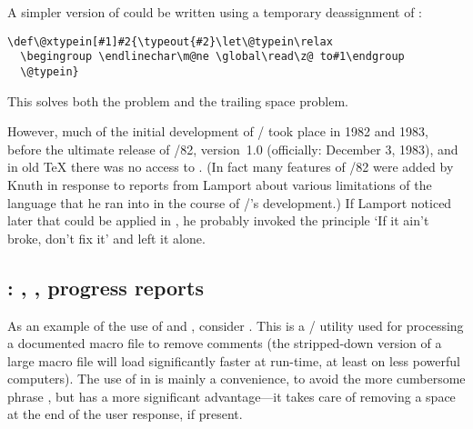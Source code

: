 {A simpler version of  could be written using
a temporary deassignment of :
\begin{verbatim}
\def\@xtypein[#1]#2{\typeout{#2}\let\@typein\relax
  \begingroup \endlinechar\m@ne \global\read\z@ to#1\endgroup
  \@typein}
\end{verbatim}
This solves both the  problem and the trailing space problem.

However, much of the initial development of \latex/ took place in 1982
and 1983, before the ultimate release of \tex/82, version~1.0
(officially: December 3, 1983), and in old \TeX{} there was no access
to . (In fact many features of \tex/82 were added by
Knuth in response to reports from Lamport about various limitations of
the language that he ran into in the course of \latex/'s development.)
If Lamport noticed later that  could be applied in
, he probably invoked the principle `If it ain't broke,
don't fix it' and left it alone.

\subsection{: , , progress reports}

As an example of the use of  and ,
consider 
\cite{docstrip}. This is a \latex/
utility used for processing a documented macro file to remove
comments (the stripped-down version of a large macro file
will load significantly faster at run-time, at least on
less powerful computers). The use of
 in  is mainly a convenience,
to avoid the more cumbersome phrase
, but  has a more
significant advantage---it takes care of removing a space
at the end of the user response, if present.

}
